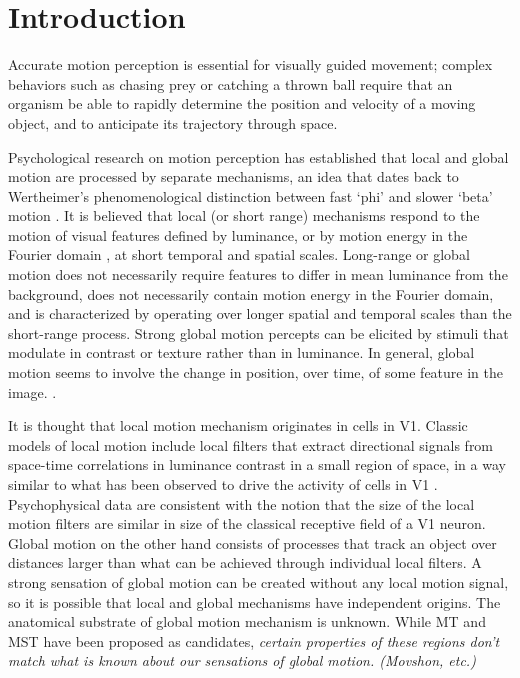 \documentclass[manuscript]{subfiles}
\begin{document}
\section[Introduction]{Introduction}\label{sec:introduction}

Accurate motion perception is essential for visually guided movement; complex behaviors such as chasing prey or catching a thrown ball require that an organism be able to rapidly determine the position and velocity of a moving object, and to anticipate its trajectory through space. 
 
Psychological research on motion perception has established that local and global motion are processed by separate mechanisms, an idea that dates back to Wertheimer's phenomenological distinction between fast `phi' and slower `beta' motion \citep{Steinman:2000ap}. It is believed that local (or short range) mechanisms respond to the motion of visual features defined by luminance, or by motion energy in the Fourier domain \citep{Adelson:1985ea}, at short temporal and spatial scales. Long-range or global motion  does not necessarily require features to differ in mean luminance from the background, does not necessarily contain motion energy in the Fourier domain, and is characterized by operating over longer spatial and temporal scales than the short-range process. Strong global motion percepts can be elicited by stimuli that modulate in contrast or texture rather than in luminance. In general, global motion seems to involve the change in position, over time, of some feature in the image. \citep{Lu:1995la}.

It is thought that local motion mechanism originates in cells in V1. Classic models of local motion include local filters that extract directional signals from space-time correlations in luminance contrast in a small region of space, in a way similar to what has been observed to drive the activity of cells in V1 . Psychophysical data are consistent with the notion that the size of the local motion filters are similar in size of the classical receptive field of a V1 neuron.  Global motion on the other hand consists of processes that track an object over distances larger than what can be achieved through individual local filters. A strong sensation of global motion can be created without any local motion signal, so it is possible that local and global mechanisms have independent origins. The anatomical substrate of global motion mechanism is unknown. While MT and MST have been proposed as candidates, \emph{certain properties of these regions don't match what is known about our sensations of global motion. (Movshon, etc.)}
\end{document}
